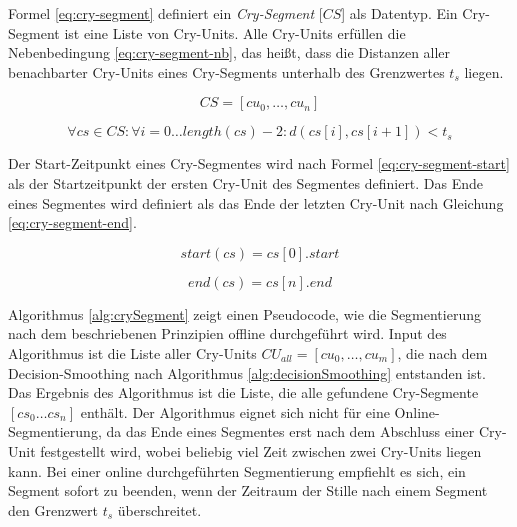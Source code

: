 Formel \ref{eq:cry-segment}  definiert ein \emph{Cry-Segment} [$CS$] als Datentyp. Ein Cry-Segment ist eine Liste von Cry-Units. Alle Cry-Units erfüllen die Nebenbedingung \ref{eq:cry-segment-nb}, das heißt, dass die Distanzen aller benachbarter Cry-Units eines Cry-Segments unterhalb des Grenzwertes $t_{s}$ liegen.

\begin{equation}
CS = [cu_0 ,  \ldots,  cu_n]
\label{eq:cry-segment}
\end{equation}

\begin{equation}
\forall cs \in CS: \forall i = 0 \ldots length(cs)-2 : d(cs[i], cs[i+1]) < t_{s}
\label{eq:cry-segment-nb}
\end{equation}

Der Start-Zeitpunkt eines Cry-Segmentes wird nach Formel \ref{eq:cry-segment-start} als der Startzeitpunkt der ersten Cry-Unit des Segmentes definiert. Das Ende eines Segmentes wird definiert als das Ende der letzten Cry-Unit nach Gleichung \ref{eq:cry-segment-end}.

\begin{equation}
start(cs) = cs[0].start
\label{eq:cry-segment-start}
\end{equation}

\begin{equation}
end(cs) = cs[n].end
\label{eq:cry-segment-end}
\end{equation}

Algorithmus \ref{alg:crySegment} zeigt einen Pseudocode, wie die Segmentierung nach dem beschriebenen Prinzipien offline durchgeführt wird. Input des Algorithmus ist die Liste aller Cry-Units $CU_{all} = [cu_0 ,\ldots, cu_m]$, die nach dem Decision-Smoothing nach Algorithmus \ref{alg:decisionSmoothing} entstanden ist.  Das Ergebnis des Algorithmus ist die Liste, die alle gefundene Cry-Segmente  $[cs_0 \ldots  cs_n]$ enthält. Der Algorithmus eignet sich nicht für eine Online-Segmentierung, da das Ende eines Segmentes erst nach dem Abschluss einer Cry-Unit festgestellt wird, wobei beliebig viel Zeit zwischen zwei Cry-Units liegen kann. Bei einer online durchgeführten Segmentierung empfiehlt es sich, ein Segment sofort zu beenden, wenn der Zeitraum der Stille nach einem Segment den Grenzwert $t_s$ überschreitet.

